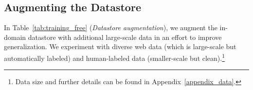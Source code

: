 \documentclass[10pt,twocolumn,letterpaper]{article}
\newcommand{\model}{\textsc{SmallCap}\xspace}
\begin{document}




\subsection{Augmenting the Datastore}
\label{subsec:largedata}

In Table~\ref{tab:training_free} (\emph{Datastore augmentation}), we augment the in-domain datastore with additional large-scale data in an effort to improve generalization. %
We experiment with diverse web data (which is large-scale but automatically labeled) and human-labeled data (smaller-scale but clean).\footnote{Data size and further details can be found in Appendix~\ref{appendix_data}.}  %
\end{document}
